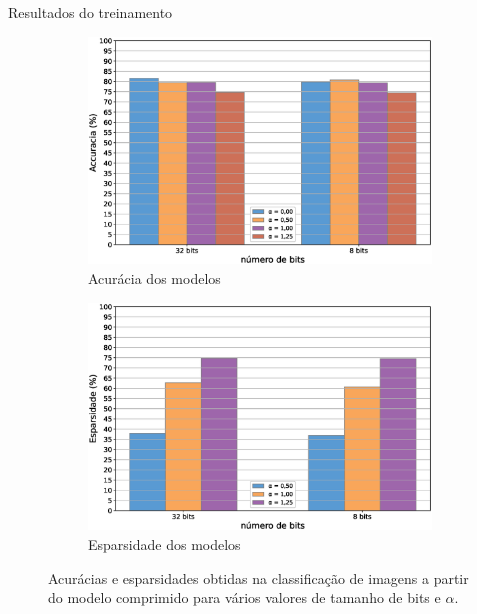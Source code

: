 \begin{frame}{Resultados do treinamento}
    \begin{figure}[H]
  \centering

  \begin{subfigure}[b]{0.49\textwidth}
    \includegraphics[width=\textwidth]{figuras/cifar_acc_fig.eps}
    \caption{Acurácia dos modelos}
  \end{subfigure}
  \hfill
  \begin{subfigure}[b]{0.49\textwidth}
    \includegraphics[width=\textwidth]{figuras/cifar_sparsity_fig.eps}
    \caption{Esparsidade dos modelos}
  \end{subfigure}
  \caption{Acurácias e esparsidades obtidas na classificação de imagens a partir do modelo comprimido para vários valores de tamanho de bits e $\alpha$.}
  \end{figure}
\end{frame}

